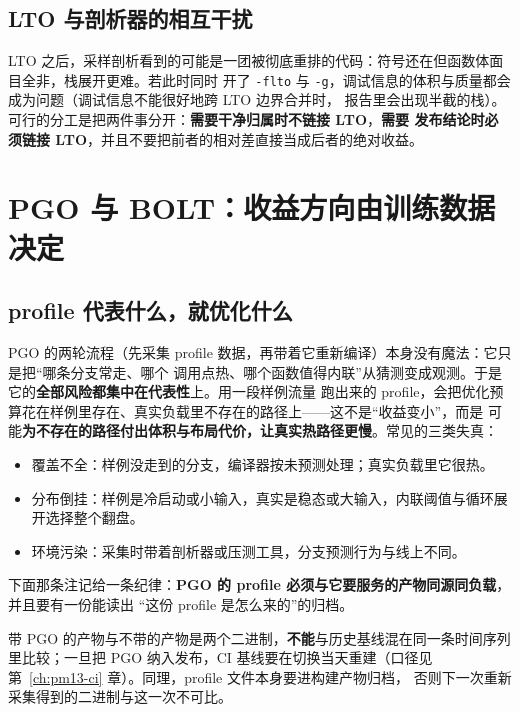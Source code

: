 \documentclass[12pt,a4paper,fontset=fandol]{ctexbook}
\newcommand{\Tp}[1]{\texttt{#1}}
\begin{document}
\subsection{LTO 与剖析器的相互干扰}

LTO 之后，采样剖析看到的可能是一团被彻底重排的代码：符号还在但函数体面目全非，栈展开更难。若此时同时
开了 \Tp{-flto} 与 \Tp{-g}，调试信息的体积与质量都会成为问题（调试信息不能很好地跨 LTO 边界合并时，
报告里会出现半截的栈）。可行的分工是把两件事分开：\textbf{需要干净归属时不链接 LTO}，\textbf{需要
发布结论时必须链接 LTO}，并且不要把前者的相对差直接当成后者的绝对收益。

\section{PGO 与 BOLT：收益方向由训练数据决定}
\label{sec:pm10-pgo}

\subsection{profile 代表什么，就优化什么}

PGO 的两轮流程（先采集 profile 数据，再带着它重新编译）本身没有魔法：它只是把``哪条分支常走、哪个
调用点热、哪个函数值得内联''从猜测变成观测。于是它的\textbf{全部风险都集中在代表性}上。用一段样例流量
跑出来的 profile，会把优化预算花在样例里存在、真实负载里不存在的路径上——这不是``收益变小''，而是
可能\textbf{为不存在的路径付出体积与布局代价，让真实热路径更慢}。常见的三类失真：

\begin{itemize}
  \item 覆盖不全：样例没走到的分支，编译器按未预测处理；真实负载里它很热。
  \item 分布倒挂：样例是冷启动或小输入，真实是稳态或大输入，内联阈值与循环展开选择整个翻盘。
  \item 环境污染：采集时带着剖析器或压测工具，分支预测行为与线上不同。
\end{itemize}

下面那条注记给一条纪律：\textbf{PGO 的 profile 必须与它要服务的产物同源同负载}，并且要有一份能读出
``这份 profile 是怎么来的''的归档。

\begin{note}[title={PGO 不改变正确性判据，但改变可比性}]
带 PGO 的产物与不带的产物是两个二进制，\textbf{不能}与历史基线混在同一条时间序列里比较；一旦把 PGO
纳入发布，CI 基线要在切换当天重建（口径见 第~\ref{ch:pm13-ci} 章）。同理，profile 文件本身要进构建产物归档，
否则下一次重新采集得到的二进制与这一次不可比。
\end{note}
\end{document}
